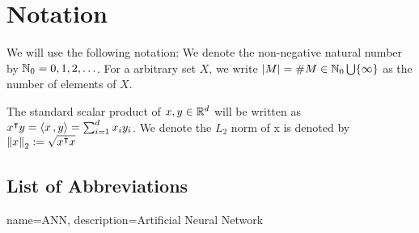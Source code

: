 \chapter*{Notation}
\label{c:Notation}

We will use the following notation: We denote the non-negative natural number by
$\mathbb{N}_0 = {0,1,2,\dots}$. For a arbitrary set $X$, we write $\left| M \right| = \# M \in
\mathbb{N}_0 \bigcup \{\infty\}$ as the number of elements of $X$.

The standard scalar product of $x,y\in\mathbb{R}^d$ will be written as $x{}^{\intercal} y =
\left\langle x\, , y \right\rangle = \sum_{i=1}^d x_iy_i$. We denote the $L_2$ norm of x is denoted by
$\left\| x \right\|_{2} := \sqrt{x{}^{\intercal} x}$

\section*{List of Abbreviations}

\printglossary

{
    name=ANN,
    description={Artificial Neural Network}
}





